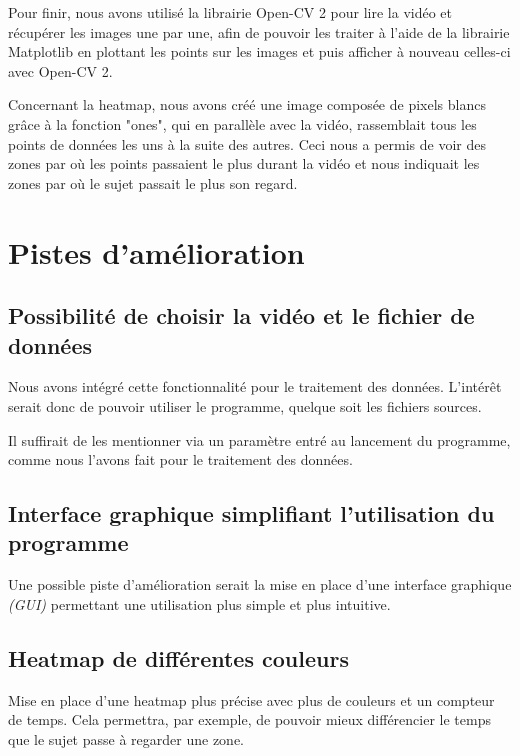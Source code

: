 \documentclass[12pt]{article}
\begin{document}
\hspace{0.3cm}

Pour finir, nous avons utilisé la librairie Open-CV 2 pour lire la vidéo et récupérer les images une par une, afin de pouvoir les traiter à l'aide de la librairie Matplotlib en plottant les points sur les images et puis afficher à nouveau celles-ci avec Open-CV 2.  

\hspace{0.3cm}

Concernant la heatmap, nous avons créé une image composée de pixels blancs grâce à la fonction "ones", qui en parallèle avec la vidéo, rassemblait tous les points de données les uns à la suite des autres. Ceci nous a permis de voir des zones par où les points passaient le plus durant la vidéo et nous indiquait les zones par où le sujet passait le plus son regard.

\newpage

\section{Pistes d'amélioration}

\subsection{Possibilité de choisir la vidéo et le fichier de données}

Nous avons intégré cette fonctionnalité pour le traitement des données.
L'intérêt serait donc de pouvoir utiliser le programme, quelque soit les fichiers sources.

Il suffirait de les mentionner via un paramètre entré au lancement du programme, comme nous l'avons fait pour le traitement des données.

\subsection{Interface graphique simplifiant l'utilisation du programme}

Une possible piste d'amélioration serait la mise en place d'une interface graphique \emph{(GUI)} permettant une utilisation plus simple et plus intuitive.

\subsection{Heatmap de différentes couleurs}

Mise en place d'une heatmap plus précise avec plus de couleurs et un compteur de temps.
Cela permettra, par exemple, de pouvoir mieux différencier le temps que le sujet passe à regarder une zone.
\end{document}

